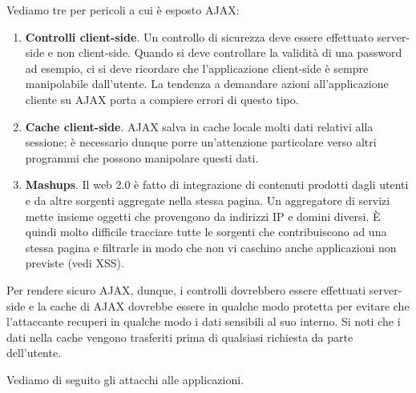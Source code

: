 Vediamo tre per pericoli a cui è esposto AJAX:
\begin{enumerate}
	\item \textbf{Controlli client-side}. Un controllo di sicurezza deve essere effettuato server-side e non client-side. Quando si deve controllare la validità di una password ad esempio, ci si deve ricordare che l'applicazione client-side è
	sempre manipolabile dall'utente. La tendenza a demandare azioni all'applicazione cliente su AJAX porta a compiere errori di questo tipo.
	\item \textbf{Cache client-side}. AJAX salva in cache locale molti dati relativi alla sessione; è necessario dunque porre un'attenzione particolare verso altri programmi che possono manipolare questi dati.
	\item \textbf{Mashups}. Il web 2.0 è fatto di integrazione di contenuti prodotti dagli utenti e da altre sorgenti aggregate nella stessa pagina. Un aggregatore di servizi mette insieme oggetti che provengono da indirizzi IP e domini diversi. È quindi molto difficile tracciare tutte le sorgenti che contribuiscono ad una stessa pagina e filtrarle in modo che non vi caschino anche applicazioni non previste (vedi XSS).
\end{enumerate}
Per rendere sicuro AJAX, dunque, i controlli dovrebbero essere effettuati server-side e la cache di AJAX dovrebbe essere in qualche modo protetta per evitare che l'attaccante recuperi in qualche modo i dati sensibili al suo interno. Si noti che i dati nella cache vengono trasferiti prima di qualsiasi richiesta da parte dell'utente.

\noindent Vediamo di seguito gli attacchi alle applicazioni.

